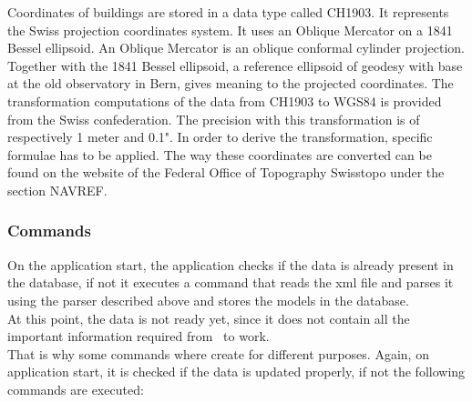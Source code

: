 Coordinates of buildings are stored in a data type called CH1903. It represents the Swiss projection coordinates system. It uses an Oblique Mercator on a 1841 Bessel ellipsoid. An Oblique Mercator is an oblique conformal cylinder projection. Together with the 1841 Bessel ellipsoid, a reference ellipsoid of geodesy with base at the old observatory in Bern, gives meaning to the projected coordinates. The transformation computations of the data from CH1903 to WGS84 is provided from the Swiss confederation. The precision with this transformation is of respectively 1 meter and 0.1". In order to derive the transformation, specific formulae has to be applied. The way these coordinates are converted can be found on the website of the Federal Office of Topography Swisstopo under the section NAVREF. 
\subsubsection{Commands}
On the application start, the application checks if the data is already present in the database, if not it executes a command that reads the xml file and parses it using the parser described above and stores the models in the database.\\  
At this point, the data is not ready yet, since it does not contain all the important information required from \applicationName\ to work.\\
That is why some commands where create for different purposes. Again, on application start, it is checked if the data is updated properly, if not the following commands are executed:
